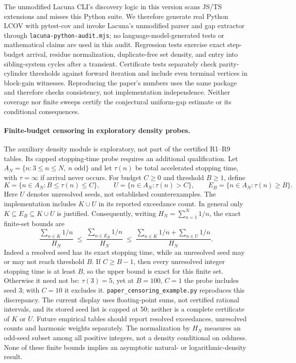 \documentclass[11pt]{amsart}
\theoremstyle{definition}
\theoremstyle{remark}
\begin{document}
The unmodified Lacuna CLI's discovery logic in this version scans JS/TS
extensions and misses this Python suite. We therefore generate real Python
LCOV with pytest-cov and invoke Lacuna's unmodified parser and gap extractor
through \texttt{lacuna-python-audit.mjs}; no language-model-generated tests
or mathematical claims are used in this audit. Regression tests exercise
exact step-budget arrival, residue normalization, duplicate-free set density,
and entry into sibling-system cycles after a transient. Certificate tests
separately check parity-cylinder thresholds against forward iteration and
include even terminal vertices in block-gain witnesses. Reproducing the
paper's numbers uses the same package and therefore checks consistency,
not implementation independence. Neither coverage nor finite sweeps certify
the conjectural uniform-gap estimate or its conditional consequences.

\paragraph{Finite-budget censoring in exploratory density probes.}
The auxiliary density module is exploratory, not part of the certified
R1--R9 tables. Its capped stopping-time probe requires an additional
qualification. Let $A_N=\{n:3\le n\le N,\ n\text{ odd}\}$ and let
$\tau(n)$ be total accelerated stopping time, with $\tau=\infty$ if
arrival never occurs. For budget $C\ge0$ and threshold $B\ge1$, define
\[
K=\{n\in A_N:B\le\tau(n)\le C\},\qquad
U=\{n\in A_N:\tau(n)>C\},\qquad
E_B=\{n\in A_N:\tau(n)\ge B\}.
\]
Here $U$ denotes unresolved seeds, not established counterexamples.
The implementation includes $K\cup U$ in its reported exceedance count.
In general only $K\subseteq E_B\subseteq K\cup U$ is justified.
Consequently, writing $H_N=\sum_{n=1}^N1/n$, the exact finite-set bounds are
\[
\frac{\sum_{n\in K}1/n}{H_N}
\;\le\;\frac{\sum_{n\in E_B}1/n}{H_N}
\;\le\;\frac{\sum_{n\in K}1/n+\sum_{n\in U}1/n}{H_N}.
\]
Indeed a resolved seed has its exact stopping time, while an unresolved
seed may or may not reach threshold $B$. If $C\ge B-1$, then every
unresolved integer stopping time is at least $B$, so the upper bound is
exact for this finite set. Otherwise it need not be: $\tau(3)=5$, yet at
$B=100$, $C=1$ the probe includes seed $3$; with $C=10$ it excludes it.
\texttt{paper\_censoring\_example.py} reproduces this discrepancy.
The current display uses floating-point sums, not certified rational
intervals, and its stored seed list is capped at 50; neither is a complete
certificate of $K$ or $U$. Future empirical tables should report resolved
exceedances, unresolved counts and harmonic weights separately. The
normalization by $H_N$ measures an odd-seed subset among all positive
integers, not a density conditional on oddness. None of these finite
bounds implies an asymptotic natural- or logarithmic-density result.
\end{document}
